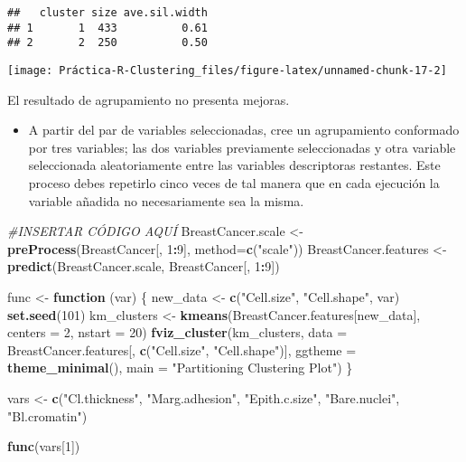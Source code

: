\documentclass[]{article}
\newenvironment{Shaded}{\begin{snugshade}}{\end{snugshade}}
\newcommand{\CommentTok}[1]{\textcolor[rgb]{0.56,0.35,0.01}{\textit{#1}}}
\newcommand{\ControlFlowTok}[1]{\textcolor[rgb]{0.13,0.29,0.53}{\textbf{#1}}}
\newcommand{\DataTypeTok}[1]{\textcolor[rgb]{0.13,0.29,0.53}{#1}}
\newcommand{\DecValTok}[1]{\textcolor[rgb]{0.00,0.00,0.81}{#1}}
\newcommand{\KeywordTok}[1]{\textcolor[rgb]{0.13,0.29,0.53}{\textbf{#1}}}
\newcommand{\NormalTok}[1]{#1}
\newcommand{\OperatorTok}[1]{\textcolor[rgb]{0.81,0.36,0.00}{\textbf{#1}}}
\newcommand{\StringTok}[1]{\textcolor[rgb]{0.31,0.60,0.02}{#1}}
\providecommand{\tightlist}{%
  \setlength{\itemsep}{0pt}\setlength{\parskip}{0pt}}
\begin{document}
\begin{verbatim}
##   cluster size ave.sil.width
## 1       1  433          0.61
## 2       2  250          0.50
\end{verbatim}

\begin{center}\texttt{[image: Práctica-R-Clustering\_files/figure-latex/unnamed-chunk-17-2]} \end{center}

El resultado de agrupamiento no presenta mejoras.

\begin{itemize}
\tightlist
\item
  A partir del par de variables seleccionadas, cree un agrupamiento
  conformado por tres variables; las dos variables previamente
  seleccionadas y otra variable seleccionada aleatoriamente entre las
  variables descriptoras restantes. Este proceso debes repetirlo cinco
  veces de tal manera que en cada ejecución la variable añadida no
  necesariamente sea la misma.
\end{itemize}

\begin{Shaded}
\begin{Highlighting}[]
\CommentTok{#INSERTAR CÓDIGO AQUÍ}
\NormalTok{BreastCancer.scale <-}\StringTok{ }\KeywordTok{preProcess}\NormalTok{(BreastCancer[, }\DecValTok{1}\OperatorTok{:}\DecValTok{9}\NormalTok{], }\DataTypeTok{method=}\KeywordTok{c}\NormalTok{(}\StringTok{"scale"}\NormalTok{))}
\NormalTok{BreastCancer.features <-}\StringTok{ }\KeywordTok{predict}\NormalTok{(BreastCancer.scale, BreastCancer[, }\DecValTok{1}\OperatorTok{:}\DecValTok{9}\NormalTok{])}

\NormalTok{func <-}\StringTok{ }\ControlFlowTok{function}\NormalTok{ (var) \{ }
\NormalTok{  new_data <-}\StringTok{ }\KeywordTok{c}\NormalTok{(}\StringTok{"Cell.size"}\NormalTok{, }\StringTok{"Cell.shape"}\NormalTok{, var)}
  \KeywordTok{set.seed}\NormalTok{(}\DecValTok{101}\NormalTok{)}
\NormalTok{  km_clusters <-}\StringTok{ }\KeywordTok{kmeans}\NormalTok{(BreastCancer.features[new_data], }\DataTypeTok{centers =} \DecValTok{2}\NormalTok{, }\DataTypeTok{nstart =} \DecValTok{20}\NormalTok{)}
  \KeywordTok{fviz_cluster}\NormalTok{(km_clusters, }\DataTypeTok{data =}\NormalTok{ BreastCancer.features[, }\KeywordTok{c}\NormalTok{(}\StringTok{"Cell.size"}\NormalTok{, }\StringTok{"Cell.shape"}\NormalTok{)],}
             \DataTypeTok{ggtheme =} \KeywordTok{theme_minimal}\NormalTok{(),}
             \DataTypeTok{main =} \StringTok{"Partitioning Clustering Plot"}\NormalTok{)}
\NormalTok{\}}

\NormalTok{vars <-}\StringTok{ }\KeywordTok{c}\NormalTok{(}\StringTok{"Cl.thickness"}\NormalTok{, }\StringTok{"Marg.adhesion"}\NormalTok{, }\StringTok{"Epith.c.size"}\NormalTok{, }\StringTok{"Bare.nuclei"}\NormalTok{, }\StringTok{"Bl.cromatin"}\NormalTok{)}

\KeywordTok{func}\NormalTok{(vars[}\DecValTok{1}\NormalTok{])}
\end{Highlighting}
\end{Shaded}
\end{document}
